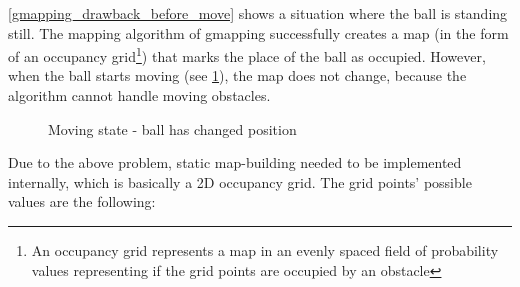 \ref{gmapping_drawback_before_move} shows a situation where the ball is standing still. The mapping algorithm of gmapping successfully creates a map (in the form of an occupancy grid\footnote{An occupancy grid represents a map in an evenly spaced field of probability values representing if the grid points are occupied by an obstacle}) that marks the place of the ball as occupied. However, when the ball starts moving (see \ref{gmapping_drawback_after_move}), the map does not change, because the algorithm cannot handle moving obstacles.

\begin{figure}[!ht]
    \centering
    \caption{Moving state - ball has changed position}
    \label{gmapping_drawback_after_move}
\end{figure}

Due to the above problem, static map-building needed to be implemented internally, which is basically a 2D occupancy grid. The grid points' possible values are the following:

